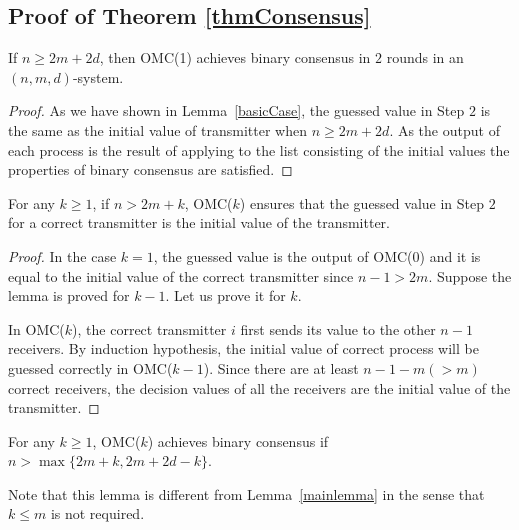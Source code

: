 \subsection{Proof of Theorem \ref{thmConsensus}}

\begin{lemma}\label{cons:2}
If $n\geqslant 2m+2d$, then  OMC(1) achieves  binary consensus in $2$ rounds in an $(n,m,d)$-system.
\end{lemma}

\begin{proof}
As we have shown in Lemma~\ref{basicCase}, the guessed value in Step $2$ 
is the same as the initial value of transmitter when $n \geqslant 2m+2d$. 
As the output of each process is the result of applying  to the list consisting of the initial values the properties of binary  consensus are satisfied.
\end{proof}

\begin{lemma}
For any $k\geqslant 1$, if $n>2m+k$, OMC($k$) ensures that the guessed value in Step $2$ for a correct transmitter is the initial value of the transmitter.
\end{lemma}

\begin{proof}
In the case $k=1$, the guessed value is the output of OMC(0) and  it is equal to the initial value of the correct transmitter since $n-1>2m$. Suppose the lemma is proved for $k-1$. Let us prove it for $k$.

In OMC($k$), the correct transmitter $i$ first sends its value to the other $n-1$ receivers. 
By induction hypothesis, the initial value of correct process will be guessed  correctly in OMC($k-1$). 
Since there are at least $n-1-m(>m)$ correct receivers, the decision values of all the receivers are the initial value of the transmitter.
\end{proof}

\begin{lemma}\label{cons:corelemma}
  For any $k \geqslant 1$, OMC($k$) achieves binary consensus if $n>\max\{2m+k,2m+2d-k\}$.
\end{lemma}

Note that this lemma is different from Lemma~\ref{mainlemma} in the sense that $k\leqslant m$ is not required.

